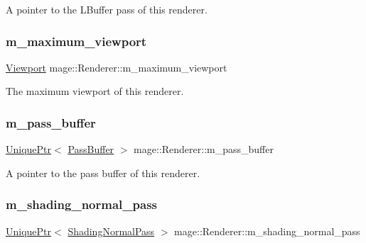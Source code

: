 A pointer to the L\+Buffer pass of this renderer. \hypertarget{classmage_1_1_renderer_a4a874bbe3cd4f19a16a65cca7bb93100}{}\label{classmage_1_1_renderer_a4a874bbe3cd4f19a16a65cca7bb93100} 
\subsubsection{\texorpdfstring{m\+\_\+maximum\+\_\+viewport}{m\_maximum\_viewport}}
{\footnotesize\ttfamily \hyperlink{classmage_1_1_viewport}{Viewport} mage\+::\+Renderer\+::m\+\_\+maximum\+\_\+viewport\hspace{0.3cm}{\ttfamily [private]}}

The maximum viewport of this renderer. \hypertarget{classmage_1_1_renderer_a304d7bdeb64906cb51f87443cf7201e1}{}\label{classmage_1_1_renderer_a304d7bdeb64906cb51f87443cf7201e1} 
\subsubsection{\texorpdfstring{m\+\_\+pass\+\_\+buffer}{m\_pass\_buffer}}
{\footnotesize\ttfamily \hyperlink{namespacemage_a3316d7143a973e37adf1110f2e80ca31}{Unique\+Ptr}$<$ \hyperlink{structmage_1_1_pass_buffer}{Pass\+Buffer} $>$ mage\+::\+Renderer\+::m\+\_\+pass\+\_\+buffer\hspace{0.3cm}{\ttfamily [private]}}

A pointer to the pass buffer of this renderer. \hypertarget{classmage_1_1_renderer_a1867f2dd151f3180b8efebba5b018fc8}{}\label{classmage_1_1_renderer_a1867f2dd151f3180b8efebba5b018fc8} 
\subsubsection{\texorpdfstring{m\+\_\+shading\+\_\+normal\+\_\+pass}{m\_shading\_normal\_pass}}
{\footnotesize\ttfamily \hyperlink{namespacemage_a3316d7143a973e37adf1110f2e80ca31}{Unique\+Ptr}$<$ \hyperlink{classmage_1_1_shading_normal_pass}{Shading\+Normal\+Pass} $>$ mage\+::\+Renderer\+::m\+\_\+shading\+\_\+normal\+\_\+pass\hspace{0.3cm}{\ttfamily [private]}}

